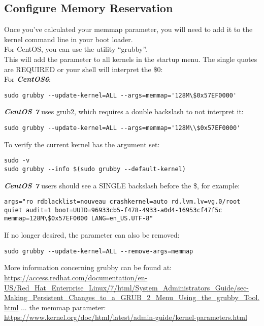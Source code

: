 \begin{flushleft}
\subsection{Configure Memory Reservation}
Once you've calculated your memmap parameter, you will need to add it to the
kernel command line in your boot loader. \\
\bigskip
For CentOS, you can use the utility ``grubby''. \\
\bigskip
This will add the parameter to all kernels in the startup menu. The single
quotes are REQUIRED or your shell will interpret the \$0: \\
\bigskip
For \textbf{\textit{CentOS6}}:\\
\begin{lstlisting}
sudo grubby --update-kernel=ALL --args=memmap='128M\$0x57EF0000'
\end{lstlisting}
\textbf{\textit{CentOS 7}} uses grub2, which requires a double backslash to not interpret it:\\
\begin{lstlisting}
sudo grubby --update-kernel=ALL --args=memmap='128M\\$0x57EF0000'
\end{lstlisting}

To verify the current kernel has the argument set:\\
\begin{lstlisting}
sudo -v
sudo grubby --info $(sudo grubby --default-kernel)
\end{lstlisting}

\textbf{\textit{CentOS 7}} users should see a SINGLE backslash before the \$, for example: \\
\begin{lstlisting}
args="ro rdblacklist=nouveau crashkernel=auto rd.lvm.lv=vg.0/root quiet audit=1 boot=UUID=96933cb5-f478-4933-a0d4-16953cf47f5c memmap=128M\$0x57EF0000 LANG=en_US.UTF-8"
\end{lstlisting}



If no longer desired, the parameter can also be removed:
\begin{lstlisting}
sudo grubby --update-kernel=ALL --remove-args=memmap
\end{lstlisting}

More information concerning grubby can be found at:\\
\url{https://access.redhat.com/documentation/en-US/Red_Hat_Enterprise_Linux/7/html/System_Administrators_Guide/sec-Making_Persistent_Changes_to_a_GRUB_2_Menu_Using_the_grubby_Tool.html}
\bigskip
... the memmap parameter:\\
\url{https://www.kernel.org/doc/html/latest/admin-guide/kernel-parameters.html}


\end{flushleft}
